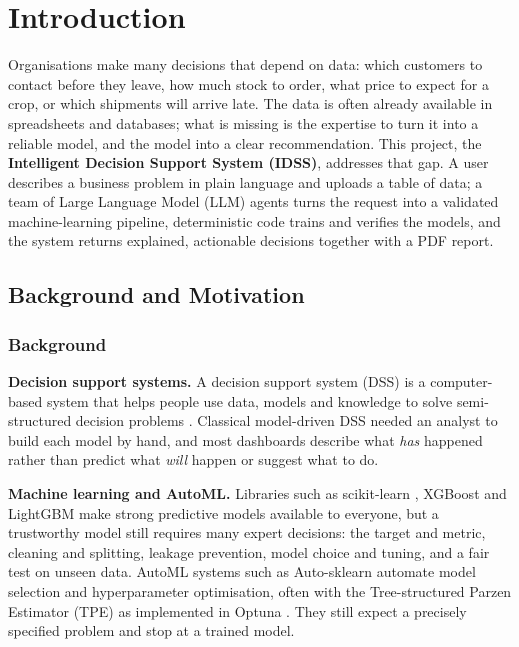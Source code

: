 \chapter{Introduction}\label{ch:1}

Organisations make many decisions that depend on data: which customers to contact before they leave, how much stock to order, what price to expect for a crop, or which shipments will arrive late. The data is often already available in spreadsheets and databases; what is missing is the expertise to turn it into a reliable model, and the model into a clear recommendation. This project, the \textbf{Intelligent Decision Support System (IDSS)}, addresses that gap. A user describes a business problem in plain language and uploads a table of data; a team of Large Language Model (LLM) agents turns the request into a validated machine-learning pipeline, deterministic code trains and verifies the models, and the system returns explained, actionable decisions together with a PDF report.

\FloatBarrier
\section{Background and Motivation}\label{sec:1.1}

\subsection{Background}\label{sec:1.1.1}

\textbf{Decision support systems.} A decision support system (DSS) is a computer-based system that helps people use data, models and knowledge to solve semi-structured decision problems \cite{ref1}. Classical model-driven DSS needed an analyst to build each model by hand, and most dashboards describe what \textit{has} happened rather than predict what \textit{will} happen or suggest what to do.

\textbf{Machine learning and AutoML.} Libraries such as scikit-learn \cite{ref2}, XGBoost \cite{ref3} and LightGBM \cite{ref4} make strong predictive models available to everyone, but a trustworthy model still requires many expert decisions: the target and metric, cleaning and splitting, leakage prevention, model choice and tuning, and a fair test on unseen data. AutoML systems such as Auto-sklearn \cite{ref5} automate model selection and hyperparameter optimisation, often with the Tree-structured Parzen Estimator (TPE) \cite{ref6} as implemented in Optuna \cite{ref7}. They still expect a precisely specified problem and stop at a trained model.

